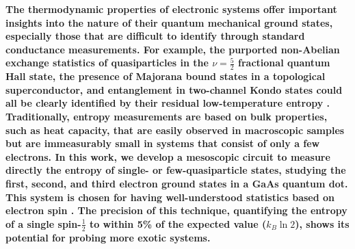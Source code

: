\documentclass[twocolumn,showpacs,amsmath,amssymb,prl,aps,superscriptaddress]{revtex4-1}
\begin{document}
\maketitle

\textbf{The thermodynamic properties of electronic systems offer important insights into the nature of their quantum mechanical ground states, especially those
that are difficult to identify through standard conductance measurements. For example, the purported non-Abelian exchange statistics of quasiparticles in the $\nu = \frac{5}{2}$ fractional quantum Hall state, the presence of Majorana bound states in a topological superconductor, and entanglement in two-channel Kondo states could all be clearly identified by their residual low-temperature entropy \cite{Cooper2009, Ben-Shach2013, Smirnov2015, Hou2012, Alkurtass2016}.  Traditionally, entropy measurements are based on bulk properties, such as heat capacity, that are easily observed in macroscopic samples but are immeasurably small in systems that consist of only a few electrons.  In this work, we develop a mesoscopic circuit to measure directly the entropy of single- or few-quasiparticle states, studying the first, second, and third electron ground states in a GaAs quantum dot.  This system is chosen for having well-understood statistics based on electron spin \cite{Tarucha1996, Ciorga2000, Duncan2000, Lindemann2002, Potok2003, Hofmann2016}.  The precision of this technique, quantifying the entropy of a single spin-$\frac{1}{2}$ to within 5\% of the expected value ($k_B \ln{2}$), shows its potential for probing more exotic systems.}
\end{document}
